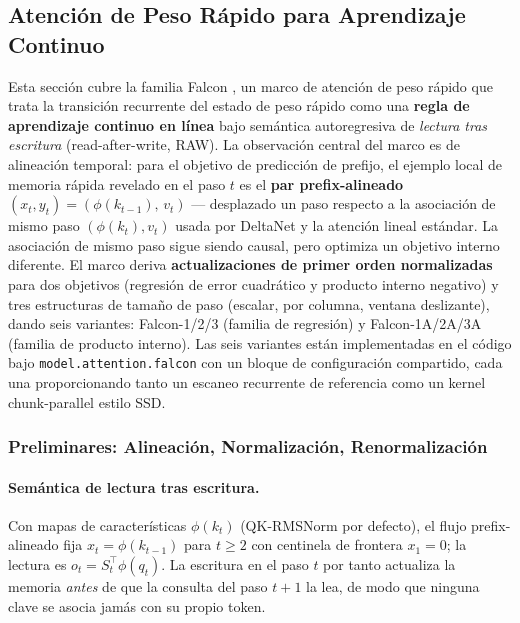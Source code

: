 \subsection{Atención de Peso Rápido para Aprendizaje Continuo}
\label{sec:annex-fast-weight}

Esta sección cubre la familia Falcon \citep{zhang_falcon_2026}, un marco de atención de peso rápido que trata la transición recurrente del estado de peso rápido como una \textbf{regla de aprendizaje continuo en línea} bajo semántica autoregresiva de \emph{lectura tras escritura} (read-after-write, RAW). La observación central del marco es de alineación temporal: para el objetivo de predicción de prefijo, el ejemplo local de memoria rápida revelado en el paso $t$ es el \textbf{par prefix-alineado} $(x_t, y_t) = (\phi(k_{t-1}),\, v_t)$ --- desplazado un paso respecto a la asociación de mismo paso $(\phi(k_t), v_t)$ usada por DeltaNet y la atención lineal estándar. La asociación de mismo paso sigue siendo causal, pero optimiza un objetivo interno diferente. El marco deriva \textbf{actualizaciones de primer orden normalizadas} para dos objetivos (regresión de error cuadrático y producto interno negativo) y tres estructuras de tamaño de paso (escalar, por columna, ventana deslizante), dando seis variantes: Falcon-1/2/3 (familia de regresión) y Falcon-1A/2A/3A (familia de producto interno). Las seis variantes están implementadas en el código bajo \texttt{model.attention.falcon} con un bloque de configuración compartido, cada una proporcionando tanto un escaneo recurrente de referencia como un kernel chunk-parallel estilo SSD.

\subsubsection{Preliminares: Alineación, Normalización, Renormalización}

\paragraph{Semántica de lectura tras escritura.} Con mapas de características $\phi(k_t)$ (QK-RMSNorm por defecto), el flujo prefix-alineado fija $x_t = \phi(k_{t-1})$ para $t \ge 2$ con centinela de frontera $x_1 = 0$; la lectura es $o_t = S_t^\top \phi(q_t)$. La escritura en el paso $t$ por tanto actualiza la memoria \emph{antes} de que la consulta del paso $t+1$ la lea, de modo que ninguna clave se asocia jamás con su propio token.

